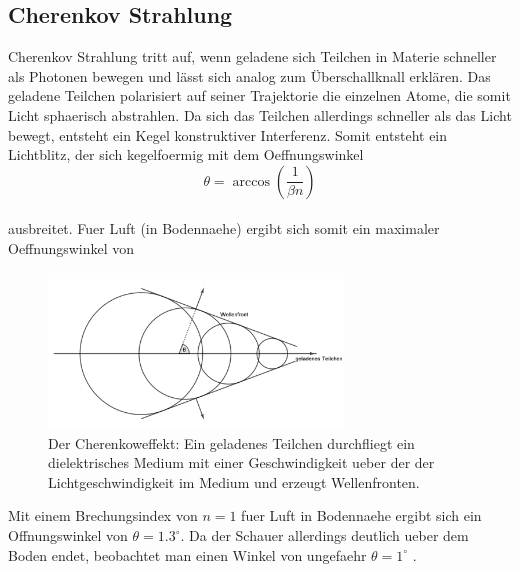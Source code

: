 \subsection{Cherenkov Strahlung}
Cherenkov Strahlung tritt auf, wenn geladene sich Teilchen in Materie schneller als Photonen bewegen und lässt sich analog zum Überschallknall erklären. Das geladene Teilchen polarisiert auf seiner Trajektorie die einzelnen Atome, die somit Licht sphaerisch abstrahlen. Da sich das Teilchen allerdings schneller als das Licht bewegt, entsteht ein Kegel konstruktiver Interferenz. Somit entsteht ein Lichtblitz, der sich kegelfoermig mit dem Oeffnungswinkel %
\begin{equation}
\theta = \arccos\left(\frac{1}{\beta n}\right) \label{eq:cherenkow}
\end{equation}\\
ausbreitet. Fuer Luft (in Bodennaehe) ergibt sich somit ein maximaler Oeffnungswinkel von
\begin{figure}[htbp]
\centering
\includegraphics[width=0.7\textwidth]{Images/cherenkow.png}
\caption{Der Cherenkoweffekt: Ein geladenes Teilchen durchfliegt ein dielektrisches Medium mit einer Geschwindigkeit ueber der der Lichtgeschwindigkeit im Medium und erzeugt Wellenfronten.}
\label{img:cherenkow}
\end{figure}
Mit einem Brechungsindex von $n=1$ fuer Luft in Bodennaehe ergibt sich ein Offnungswinkel von $\theta=1.3^{\circ}$. Da der Schauer allerdings deutlich ueber dem Boden endet, beobachtet man einen Winkel von ungefaehr $\theta=1^{\circ}$ \cite{Grupen}.



